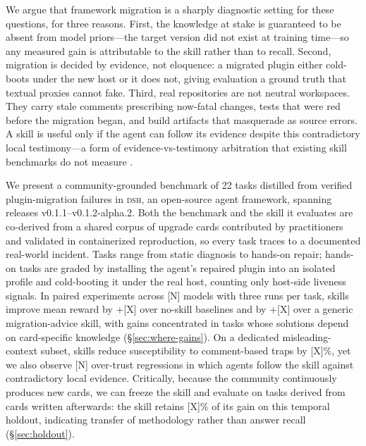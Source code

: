\documentclass[11pt]{article}
\newcommand{\framework}{\textsc{dsh}}
\begin{document}
We argue that framework migration is a sharply diagnostic setting for these questions, for three reasons.
First, the knowledge at stake is guaranteed to be absent from model priors---the target version did not exist at training time---so any measured gain is attributable to the skill rather than to recall.
Second, migration is decided by evidence, not eloquence: a migrated plugin either cold-boots under the new host or it does not, giving evaluation a ground truth that textual proxies cannot fake.
Third, real repositories are not neutral workspaces.
They carry stale comments prescribing now-fatal changes, tests that were red before the migration began, and build artifacts that masquerade as source errors.
A skill is useful only if the agent can follow its evidence despite this contradictory local testimony---a form of evidence-vs-testimony arbitration that existing skill benchmarks do not measure \citep{adversarialcomments,knowledgeclashes}.

We present a community-grounded benchmark of 22 tasks distilled from verified plugin-migration failures in \framework{}, an open-source agent framework, spanning releases v0.1.1--v0.1.2-alpha.2.
Both the benchmark and the skill it evaluates are co-derived from a shared corpus of upgrade cards contributed by practitioners and validated in containerized reproduction, so every task traces to a documented real-world incident.
Tasks range from static diagnosis to hands-on repair; hands-on tasks are graded by installing the agent's repaired plugin into an isolated profile and cold-booting it under the real host, counting only host-side liveness signals.
In paired experiments across [N] models with three runs per task, skills improve mean reward by +[X] over no-skill baselines and by +[X] over a generic migration-advice skill, with gains concentrated in tasks whose solutions depend on card-specific knowledge (\S\ref{sec:where-gains}).
On a dedicated misleading-context subset, skills reduce susceptibility to comment-based traps by [X]\%, yet we also observe [N] over-trust regressions in which agents follow the skill against contradictory local evidence.
Critically, because the community continuously produces new cards, we can freeze the skill and evaluate on tasks derived from cards written afterwards: the skill retains [X]\% of its gain on this temporal holdout, indicating transfer of methodology rather than answer recall (\S\ref{sec:holdout}).
\end{document}

